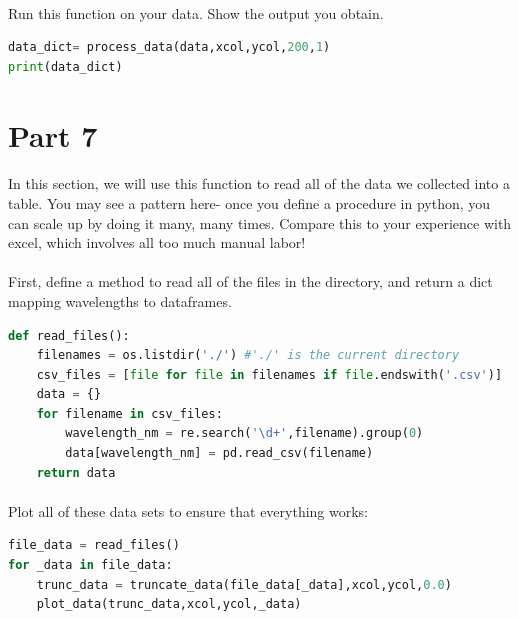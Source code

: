 \documentclass{journal}
\begin{document}
\paragraph{}
Run this function on your data. Show the output you obtain.
\begin{lstlisting}[language=python]
data_dict= process_data(data,xcol,ycol,200,1)
print(data_dict)
\end{lstlisting}

\section*{Part 7}
\paragraph{}
In this section, we will use this function to read all of the data we collected into a table. You may see a pattern here- once you define a procedure in python, you can scale up by doing it many, many times. Compare this to your experience with excel, which involves all too much manual labor!
\paragraph{}
First, define a method to read all of the files in the directory, and return a dict mapping wavelengths to dataframes.
\begin{lstlisting}[language=python]
def read_files():
    filenames = os.listdir('./') #'./' is the current directory
    csv_files = [file for file in filenames if file.endswith('.csv')]
    data = {}
    for filename in csv_files:
        wavelength_nm = re.search('\d+',filename).group(0)
        data[wavelength_nm] = pd.read_csv(filename)
    return data
\end{lstlisting}


\paragraph{}
Plot all of these data sets to ensure that everything works:
\begin{lstlisting}[language=python]
file_data = read_files()
for _data in file_data:
    trunc_data = truncate_data(file_data[_data],xcol,ycol,0.0)
    plot_data(trunc_data,xcol,ycol,_data)
\end{lstlisting}
\end{document}

